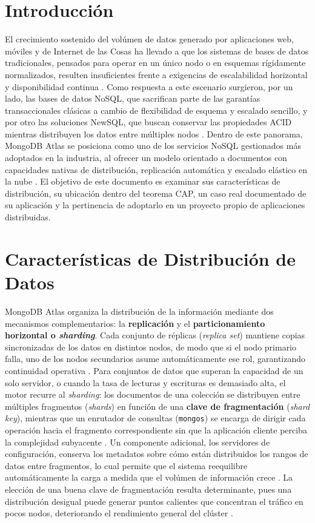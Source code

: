 \documentclass[10pt,journal]{IEEEtran}
\begin{document}
\section{Introducci\'on}
El crecimiento sostenido del vol\'umen de datos generado por aplicaciones web, m\'oviles y de Internet de las Cosas ha llevado a que los sistemas de bases de datos tradicionales, pensados para operar en un \'unico nodo o en esquemas r\'igidamente normalizados, resulten insuficientes frente a exigencias de escalabilidad horizontal y disponibilidad continua \cite{davoudian2018survey}. Como respuesta a este escenario surgieron, por un lado, las bases de datos NoSQL, que sacrifican parte de las garant\'ias transaccionales cl\'asicas a cambio de flexibilidad de esquema y escalado sencillo, y por otro las soluciones NewSQL, que buscan conservar las propiedades ACID mientras distribuyen los datos entre m\'ultiples nodos \cite{kim2020migracion}. Dentro de este panorama, MongoDB Atlas se posiciona como uno de los servicios NoSQL gestionados m\'as adoptados en la industria, al ofrecer un modelo orientado a documentos con capacidades nativas de distribuci\'on, replicaci\'on autom\'atica y escalado el\'astico en la nube \cite{davoudian2018survey}. El objetivo de este documento es examinar sus caracter\'isticas de distribuci\'on, su ubicaci\'on dentro del teorema CAP, un caso real documentado de su aplicaci\'on y la pertinencia de adoptarlo en un proyecto propio de aplicaciones distribuidas.

\section{Caracter\'isticas de Distribuci\'on de Datos}
MongoDB Atlas organiza la distribuci\'on de la informaci\'on mediante dos mecanismos complementarios: la \textbf{replicaci\'on} y el \textbf{particionamiento horizontal o \textit{sharding}}. Cada conjunto de r\'eplicas (\textit{replica set}) mantiene copias sincronizadas de los datos en distintos nodos, de modo que si el nodo primario falla, uno de los nodos secundarios asume autom\'aticamente ese rol, garantizando continuidad operativa \cite{felizzi2024sharding}. Para conjuntos de datos que superan la capacidad de un solo servidor, o cuando la tasa de lecturas y escrituras es demasiado alta, el motor recurre al \textit{sharding}: los documentos de una colecci\'on se distribuyen entre m\'ultiples fragmentos (\textit{shards}) en funci\'on de una \textbf{clave de fragmentaci\'on} (\textit{shard key}), mientras que un enrutador de consultas (\texttt{mongos}) se encarga de dirigir cada operaci\'on hacia el fragmento correspondiente sin que la aplicaci\'on cliente perciba la complejidad subyacente \cite{felizzi2024sharding,antas2022covid}. Un componente adicional, los servidores de configuraci\'on, conserva los metadatos sobre c\'omo est\'an distribuidos los rangos de datos entre fragmentos, lo cual permite que el sistema reequilibre autom\'aticamente la carga a medida que el vol\'umen de informaci\'on crece \cite{felizzi2024sharding}. La elecci\'on de una buena clave de fragmentaci\'on resulta determinante, pues una distribuci\'on desigual puede generar puntos calientes que concentran el tr\'afico en pocos nodos, deteriorando el rendimiento general del cl\'uster \cite{davoudian2018survey}.
\end{document}
